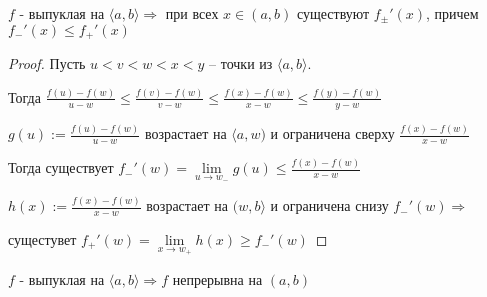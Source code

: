 \begin{theorem-non}
    $f$ - выпуклая на $\langle a, b \rangle \Longrightarrow$ при всех $x \in (a, b)$
    существуют $f_{\pm}'(x)$, причем $f_{-}'(x) \leqslant f_{+}'(x)$

    \begin{proof}
        Пусть $u < v < w < x < y$ -- точки из $\langle a, b \rangle$. 
        
        Тогда $\frac{f(u) - f(w)}{u - w} \leqslant \frac{f(v) - f(w)}{v - w} \leqslant \frac{f(x) - f(w)}{x - w} \leqslant \frac{f(y) - f(w)}{y - w}$

        $g(u) := \frac{f(u) - f(w)}{u - w}$ возрастает на $\langle a, w)$ и ограничена сверху 
        $\frac{f(x) - f(w)}{x - w}$

        Тогда существует $f_{-}'(w) = \lim\limits_{u \longrightarrow w_{-}}{g(u)} \leqslant \frac{f(x) - f(w)}{x - w}$

        $h(x) := \frac{f(x) - f(w)}{x - w}$ возрастает на $( w, b \rangle$ и ограничена снизу 
        $f_{-}'(w) \Longrightarrow$ 
        
        сущестувет $f_{+}'(w) = \lim\limits_{x \longrightarrow w_{+}}{h(x)} \geqslant f_{-}'(w) $
    \end{proof}
\end{theorem-non}

\follow \; $f$ - выпуклая на $\langle a, b \rangle \Longrightarrow f$ непрерывна на $(a, b)$ 
